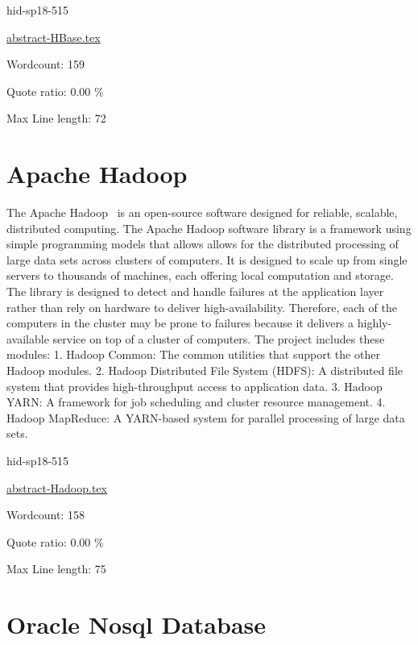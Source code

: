 \begin{IU}

hid-sp18-515

\href{https://github.com/cloudmesh-community/hid-sp18-515/blob/master//technology/abstract-HBase.tex}{abstract-HBase.tex}

 

Wordcount: 159


Quote ratio: 0.00 \%
 
Max Line length: 72
\end{IU}

\section{Apache Hadoop}

The Apache Hadoop~\cite{hid-sp18-515-www-hadoop} is an open-source 
software designed for reliable, scalable, distributed computing. 
The Apache Hadoop software library is a framework using simple programming 
models that allows allows for the distributed processing of large 
data sets across clusters of computers.
It is designed to scale up from single servers to thousands of 
machines, each offering local computation and storage.
The library is designed to detect and handle failures at the 
application layer rather than rely on hardware to deliver 
high-availability.
Therefore, each of the computers in the cluster may be prone to failures 
because it delivers a highly-available service on top of a 
cluster of computers. 
The project includes these modules:
1. Hadoop Common:
The common utilities that support the other Hadoop modules.
2. Hadoop Distributed File System (HDFS):
A distributed file system that provides high-throughput access to 
application data.
3. Hadoop YARN:
A framework for job scheduling and cluster resource management. 
4. Hadoop MapReduce: 
A YARN-based system for parallel processing of large data sets.


\begin{IU}

hid-sp18-515

\href{https://github.com/cloudmesh-community/hid-sp18-515/blob/master//technology/abstract-Hadoop.tex}{abstract-Hadoop.tex}

 

Wordcount: 158


Quote ratio: 0.00 \%
 
Max Line length: 75
\end{IU}

\section{Oracle Nosql Database}

